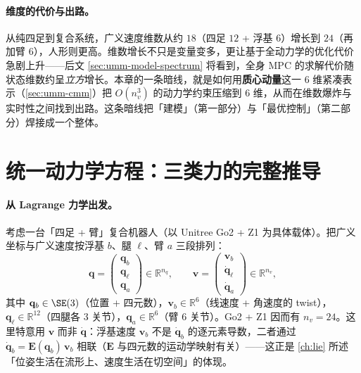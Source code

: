 \paragraph{维度的代价与出路。}
从纯四足到复合系统，广义速度维数从约 $18$（四足 $12$ + 浮基 $6$）增长到 $24$（再加臂 $6$），人形则更高。维数增长不只是变量变多，更让基于全动力学的优化代价急剧上升——后文 \cref{sec:umm-model-spectrum} 将看到，全身 MPC 的求解代价随状态维数约呈\emph{立方}增长。本章的一条暗线，就是如何用\textbf{质心动量}这一 $6$ 维紧凑表示（\cref{sec:umm-cmm}）把 $O(n_v^3)$ 的动力学约束压缩到 $6$ 维，从而在维数爆炸与实时性之间找到出路。这条暗线把「建模」（第一部分）与「最优控制」（第二部分）焊接成一个整体。

\section{统一动力学方程：三类力的完整推导}
\label{sec:umm-unified}

\paragraph{从 Lagrange 力学出发。}
考虑一台「四足 + 臂」复合机器人（以 Unitree Go2 + Z1 为具体载体）。把广义坐标与广义速度按浮基 $b$、腿 $\ell$、臂 $a$ 三段排列：
\begin{equation}
  \mathbf q=\begin{pmatrix}\mathbf q_b\\ \mathbf q_\ell\\ \mathbf q_a\end{pmatrix}\in\mathbb R^{n_q},
  \qquad
  \mathbf v=\begin{pmatrix}\mathbf v_b\\ \dot{\mathbf q}_\ell\\ \dot{\mathbf q}_a\end{pmatrix}\in\mathbb R^{n_v},
  \label{eq:umm-qv}
\end{equation}
其中 $\mathbf q_b\in\SE(3)$（位置 + 四元数），$\mathbf v_b\in\mathbb R^6$（线速度 + 角速度的 twist），$\mathbf q_\ell\in\mathbb R^{12}$（四腿各 $3$ 关节），$\mathbf q_a\in\mathbb R^{6}$（臂 $6$ 关节）。Go2 + Z1 因而有 $n_v=24$。这里特意用 $\mathbf v$ 而非 $\dot{\mathbf q}$：浮基速度 $\mathbf v_b$ 不是 $\dot{\mathbf q}_b$ 的逐元素导数，二者通过 $\dot{\mathbf q}_b=\mathbf E(\mathbf q_b)\,\mathbf v_b$ 相联（$\mathbf E$ 与四元数的运动学映射有关）——这正是 \cref{ch:lie} 所述「位姿生活在流形上、速度生活在切空间」的体现。

